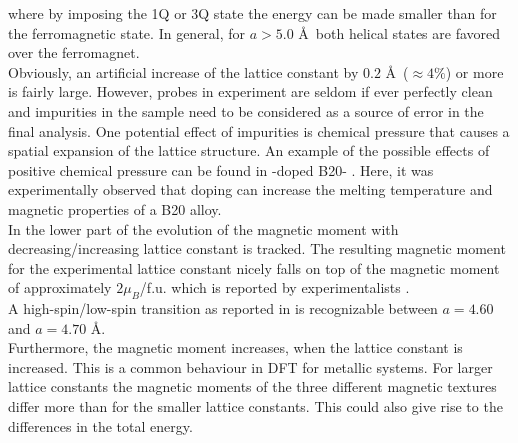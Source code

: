 \documentclass [a4paper, 12pt]{article}
\begin{document}
where by imposing the 1Q or 3Q state the energy can be made smaller than for the ferromagnetic state.
In general, for $a>5.0$ \AA \, both helical states are favored over the ferromagnet.
\\
Obviously, an artificial increase of the lattice constant by
$0.2$ \AA \, ($\approx 4 \%$) or more is fairly large.
However, probes in experiment are seldom if ever perfectly clean and
impurities in the sample need to be considered as a source of error in the
final analysis. One potential
effect of impurities is chemical pressure that causes a spatial expansion of the
lattice structure.
An example of the possible effects of positive chemical pressure
can be found in -doped B20- \cite{stolt_chemical_2018}. 
Here, it was experimentally observed
that doping can increase the melting temperature and magnetic properties of a B20 alloy.
\\
In the lower part of  the evolution of the magnetic moment
with decreasing/increasing lattice constant is tracked.
The resulting magnetic moment for the experimental lattice constant nicely falls 
on top of the magnetic moment of approximately $2 \mu_{B}$/f.u. 
which is reported by experimentalists \cite{yaouanc_magnetic_2017}.
\\
A high-spin/low-spin transition as reported in \cite{rosler_ab_2012}
is recognizable between $a=4.60$ and $a=4.70$ \AA.
\\
Furthermore, the magnetic moment increases, when the lattice constant is increased.
This is a common behaviour in DFT for metallic systems.
For larger lattice constants the magnetic moments of the three different
magnetic textures differ more than for the smaller lattice constants.
This could also give rise to the differences in the total energy.\\
\end{document}
